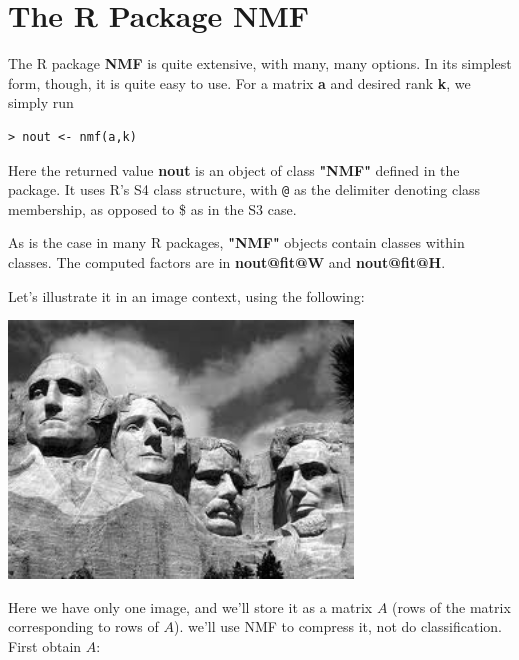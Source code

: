 % 
% 

\section{The R Package NMF}

The R package {\bf NMF} is quite extensive, with many, many options.  In
its simplest form, though, it is quite easy to use.  For a matrix {\bf
a} and desired rank {\bf k}, we simply run

\begin{lstlisting}
> nout <- nmf(a,k)
\end{lstlisting}

Here the returned value {\bf nout} is an object of class {\bf "NMF"}
defined in the package.  It uses R's S4 class structure, with
\lstinline{@} as the delimiter denoting class membership, as opposed to
\$ as in the S3 case.  

As is the case in many R packages, {\bf "NMF"} objects contain classes
within classes.  The computed factors are in {\bf nout@fit@W} and {\bf
nout@fit@H}.

Let's illustrate it in an image context, using the following:

\includegraphics[width=3.6in]{Images/MtRush.png}

Here we have only one image, and we'll store it as a matrix $A$ (rows of
the matrix corresponding to rows of $A$).  we'll use NMF to compress it,
not do classification.  First obtain $A$:

